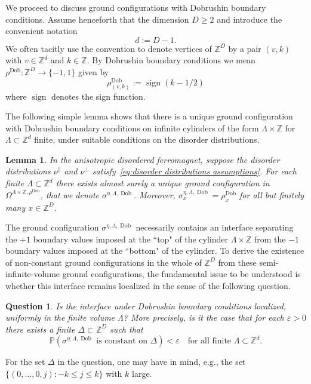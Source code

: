 \documentclass[11pt, reqno]{amsart}
\newtheorem{lemma}[theorem]{Lemma}
\newtheorem{question}[theorem]{Question}
\newcommand{\Z}{\mathbb{Z}}
\newcommand{\eps}{\varepsilon}
\DeclareMathOperator{\sign}{sign}
\DeclareMathOperator{\Dob}{Dob}
\renewcommand{\P}{\mathbb{P}}
\numberwithin{equation}{section}
\begin{document}
We proceed to discuss ground configurations with Dobrushin boundary conditions. Assume henceforth that the dimension $D\ge 2$ and introduce the convenient notation
\begin{equation}
d := D-1.
\end{equation}
We often tacitly use the convention to denote vertices of $\Z^D$ by a pair $(v,k)$ with $v\in\Z^d$ and $k\in\Z$.
By Dobrushin boundary conditions we mean $\rho^{\Dob}\colon \Z^D\to\{-1,1\}$ given by
\begin{equation}\label{eq:rho Dob def}
\rho^{\Dob}_{(v,k)} := \sign(k - 1/2)
\end{equation}
where $\sign$ denotes the sign function. 
   
The following simple lemma shows that there is a unique ground configuration with Dobrushin boundary conditions on infinite cylinders of the form $\Lambda\times\Z$ for $\Lambda\subset\Z^d$ finite, under suitable conditions on the disorder distributions.
\begin{lemma}\label{lem:semi infinite volume ground configuration}
In the anisotropic disordered ferromagnet, suppose the disorder distributions $\nu^\parallel$ and $\nu^\perp$ satisfy~\eqref{eq:disorder distributions assumptions}. 
For each finite $\Lambda\subset\Z^d$ there exists almost surely a \emph{unique} ground configuration in $\Omega^{\Lambda\times{\mathbb Z},\rho^{\Dob}}$,
that we denote $\sigma^{\eta,\Lambda,\Dob}$. 
Moreover, $\sigma^{\eta,\Lambda,\Dob}_x =\rho^{\Dob}_x$ for all but finitely many $x\in\Z^D$.
\end{lemma}
The ground configuration $\sigma^{\eta,\Lambda,\Dob}$ necessarily contains an interface separating the $+1$ boundary values imposed at the ``top" of the cylinder $\Lambda\times\Z$ from the $-1$ boundary values imposed at the ``bottom" of the cylinder. To derive the existence of non-constant ground configurations in the whole of $\Z^D$ from these semi-infinite-volume ground configurations, the fundamental issue to be understood is whether this interface remains localized in the sense of the following question.
\begin{question}\label{q:localization of Dobrushin interface}
Is the interface under Dobrushin boundary conditions localized, uniformly in the finite volume $\Lambda$? More precisely, is it the case that for each $\eps>0$ there exists a finite $\Delta\subset\Z^D$ such that
\begin{equation}
\P(\sigma^{\eta,\Lambda,\Dob}\text{ is constant on }\Delta)<\eps\quad\text{for all finite $\Lambda\subset\Z^d$}.
\end{equation}
\end{question}
For the set $\Delta$ in the question, one may have in mind, e.g., the set $\{(0,\ldots,0,j)\colon -k\le j\le k\}$ with $k$ large.
\end{document}
